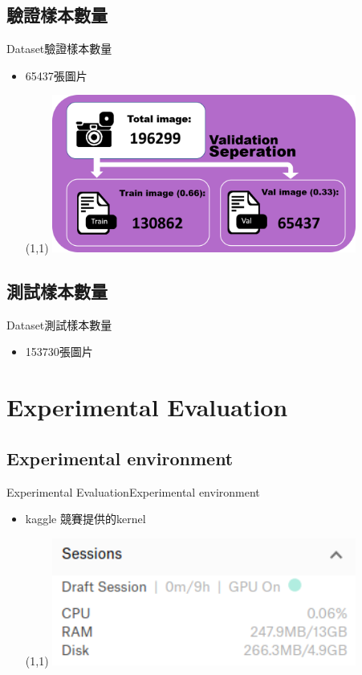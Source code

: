\documentclass{beamer}
\begin{document}
\begin{CJK}{UTF8}{}
\subsection{驗證樣本數量}

\begin{frame}{Dataset}{驗證樣本數量}
\vspace{-4.5cm}
	\begin{itemize}
	\item{
		65437張圖片
		\begin{textblock}{3}(1,1)
		\includegraphics[width=10cm]{data_split.png}
		\end{textblock}
	}
	\end{itemize}
\end{frame}

\subsection{測試樣本數量}

\begin{frame}{Dataset}{測試樣本數量}
	\begin{itemize}
	\item{
		153730張圖片
	}
	\end{itemize}
\end{frame}

\section{Experimental Evaluation}

\subsection{Experimental environment}

\begin{frame}{Experimental Evaluation}{Experimental environment}
\vspace{-4.5cm}
	\begin{itemize}
	\item{
		kaggle 競賽提供的kernel
		\begin{textblock}{3}(1,1)
		\includegraphics[width=10cm]{kernel.png}
		\end{textblock}
		
}
\end{itemize}
\end{frame}
\end{CJK}
\end{document}
